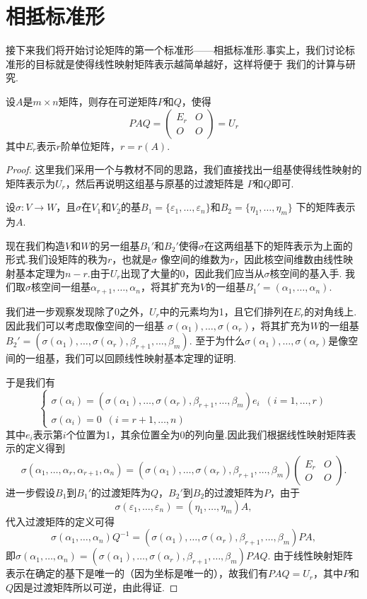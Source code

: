 \section{相抵标准形}
接下来我们将开始讨论矩阵的第一个标准形——相抵标准形.事实上，我们讨论标准形的目标就是使得线性映射矩阵表示越简单越好，这样将便于
我们的计算与研究.
\begin{theorem}\label{thm:11:相抵标准形}
    设$A$是$m\times n$矩阵，则存在可逆矩阵$P$和$Q$，使得
    \[PAQ=\begin{pmatrix}
        E_r & O \\ O & O
    \end{pmatrix}=U_r\]
    其中$E_r$表示$r$阶单位矩阵，$r=r(A)$.
\end{theorem}
\begin{proof}
    这里我们采用一个与教材不同的思路，我们直接找出一组基使得线性映射的矩阵表示为$U_r$，然后再说明这组基与原基的过渡矩阵是
    $P$和$Q$即可.

    设$\sigma:V\to W$，且$\sigma$在$V_1$和$V_2$的基$B_1=\{\varepsilon_1,\ldots,\varepsilon_n\}$和$B_2=\{\eta_1,\ldots,\eta_m\}$
    下的矩阵表示为$A$.

    现在我们构造$V$和$W$的另一组基$B_1'$和$B_2'$使得$\sigma$在这两组基下的矩阵表示为上面的形式.我们设矩阵的秩为$r$，也就是$\sigma$
    像空间的维数为$r$，因此核空间维数由线性映射基本定理为$n-r$.由于$U_r$出现了大量的0，因此我们应当从$\sigma$核空间的基入手.
    我们取$\sigma$核空间一组基$\alpha_{r+1},\ldots,\alpha_n$，将其扩充为$V$的一组基$B_1'=(\alpha_1,\ldots,\alpha_n)$.

    我们进一步观察发现除了0之外，$U_r$中的元素均为1，且它们排列在$E_r$的对角线上.因此我们可以考虑取像空间的一组基
    $\sigma(\alpha_1),\ldots,\sigma(\alpha_r)$，将其扩充为$W$的一组基$B_2'=(\sigma(\alpha_1),\ldots,\sigma(\alpha_r),\beta_{r+1},\ldots,\beta_m)$.
    至于为什么$\sigma(\alpha_1),\ldots,\sigma(\alpha_r)$是像空间的一组基，我们可以回顾线性映射基本定理的证明.

    于是我们有
    \[\begin{cases}
        \sigma(\alpha_i)=(\sigma(\alpha_1),\ldots,\sigma(\alpha_r),\beta_{r+1},\ldots,\beta_m)e_i\enspace(i=1,\ldots,r) \\
        \sigma(\alpha_i)=0\enspace(i=r+1,\ldots,n)
    \end{cases}\]
    其中$e_i$表示第$i$个位置为1，其余位置全为0的列向量.因此我们根据线性映射矩阵表示的定义得到
    \[\sigma(\alpha_1,\ldots,\alpha_r,\alpha_{r+1},\alpha_n)=(\sigma(\alpha_1),\ldots,\sigma(\alpha_r),\beta_{r+1},\ldots,\beta_m)\begin{pmatrix}
        E_r & O \\ O & O
    \end{pmatrix}.\]
    进一步假设$B_1$到$B_1'$的过渡矩阵为$Q$，$B_2'$到$B_2$的过渡矩阵为$P$，由于
    \[\sigma(\varepsilon_1,\ldots,\varepsilon_n)=(\eta_1,\ldots,\eta_m)A,\]
    代入过渡矩阵的定义可得
    \[\sigma(\alpha_1,\ldots,\alpha_n)Q^{-1}=(\sigma(\alpha_1),\ldots,\sigma(\alpha_r),\beta_{r+1},\ldots,\beta_m)PA,\]
    即$\sigma(\alpha_1,\ldots,\alpha_n)=(\sigma(\alpha_1),\ldots,\sigma(\alpha_r),\beta_{r+1},\ldots,\beta_m)PAQ$.
    由于线性映射矩阵表示在确定的基下是唯一的（因为坐标是唯一的），故我们有$PAQ=U_r$，其中$P$和$Q$因是过渡矩阵所以可逆，由此得证.
\end{proof}

